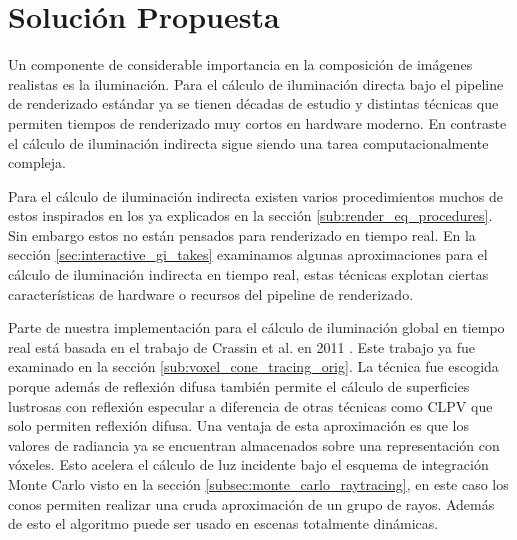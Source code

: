 \chapter{Solución Propuesta}
\label{chap:proposal}

Un componente de considerable importancia en la composición de imágenes realistas es la iluminación. Para el cálculo de iluminación directa bajo el pipeline de renderizado estándar ya se tienen décadas de estudio y distintas técnicas que permiten tiempos de renderizado muy cortos en hardware moderno. En contraste el cálculo de iluminación indirecta sigue siendo una tarea computacionalmente compleja. 

Para el cálculo de iluminación indirecta existen varios procedimientos muchos de estos inspirados en los ya explicados en la sección \ref{sub:render_eq_procedures}. Sin embargo estos no están pensados para renderizado en tiempo real. En la sección \ref{sec:interactive_gi_takes} examinamos algunas aproximaciones para el cálculo de iluminación indirecta en tiempo real, estas técnicas explotan ciertas características de hardware o recursos del pipeline de renderizado.

Parte de nuestra implementación para el cálculo de iluminación global en tiempo real está basada en el trabajo de Crassin et al. en 2011 \cite{CNSGE11b}. Este trabajo ya fue examinado en la sección \ref{sub:voxel_cone_tracing_orig}. La técnica fue escogida porque además de reflexión difusa también permite el cálculo de superficies lustrosas con reflexión especular a diferencia de otras técnicas como \ac{CLPV} que solo permiten reflexión difusa. Una ventaja de esta aproximación es que los valores de radiancia ya se encuentran almacenados sobre una representación con vóxeles. Esto acelera el cálculo de luz incidente bajo el esquema de integración Monte Carlo visto en la sección \ref{subsec:monte_carlo_raytracing}, en este caso los conos permiten realizar una cruda aproximación de un grupo de rayos. Además de esto el algoritmo puede ser usado en escenas totalmente dinámicas.








